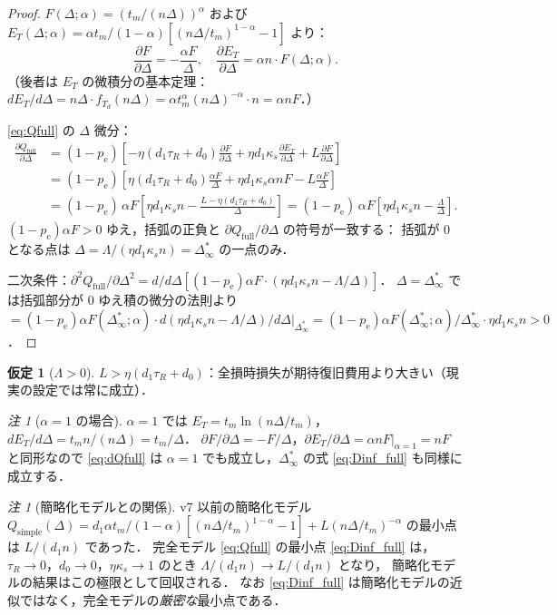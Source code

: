 \documentclass[12pt,a4paper]{article}
\theoremstyle{plain}
\theoremstyle{definition}
\newtheorem{assumption}[theorem]{仮定}
\theoremstyle{remark}
\newtheorem{remark}[theorem]{注}
\newcommand{\pe}{p_{\mathrm{e}}}
\newcommand{\Qf}{Q_{\mathrm{full}}}
\newcommand{\Dinf}{\Delta^{*}_{\infty}}
\begin{document}
\begin{proof}
$F(\Delta;\alpha)=(t_m/(n\Delta))^\alpha$ および $E_T(\Delta;\alpha)=\alpha t_m/(1-\alpha)[(n\Delta/t_m)^{1-\alpha}-1]$ より：
\[
\frac{\partial F}{\partial\Delta}=-\frac{\alpha F}{\Delta},\quad
\frac{\partial E_T}{\partial\Delta}=\alpha n\cdot F(\Delta;\alpha).
\]
（後者は $E_T$ の微積分の基本定理：$dE_T/d\Delta=n\Delta\cdot f_{T_d}(n\Delta)=\alpha t_m^\alpha(n\Delta)^{-\alpha}\cdot n=\alpha nF$．）

\eqref{eq:Qfull} の $\Delta$ 微分：
\begin{align*}
\frac{\partial\Qf}{\partial\Delta}
&=(1-\pe)\left[-\eta(d_1\tau_R+d_0)\frac{\partial F}{\partial\Delta}
+\eta d_1\kappa_s\frac{\partial E_T}{\partial\Delta}+L\frac{\partial F}{\partial\Delta}\right]\\
&=(1-\pe)\left[\eta(d_1\tau_R+d_0)\frac{\alpha F}{\Delta}
+\eta d_1\kappa_s\alpha n F-L\frac{\alpha F}{\Delta}\right]\\
&=(1-\pe)\,\alpha F\left[\eta d_1\kappa_s n-\frac{L-\eta(d_1\tau_R+d_0)}{\Delta}\right]
=(1-\pe)\,\alpha F\left[\eta d_1\kappa_s n-\frac{\Lambda}{\Delta}\right].
\end{align*}
$(1-\pe)\alpha F>0$ ゆえ，括弧の正負と $\partial\Qf/\partial\Delta$ の符号が一致する：
括弧が 0 となる点は $\Delta=\Lambda/(\eta d_1\kappa_s n)=\Dinf$ の一点のみ．

二次条件：$\partial^2\Qf/\partial\Delta^2=d/d\Delta[(1-\pe)\alpha F\cdot(\eta d_1\kappa_s n-\Lambda/\Delta)]$．
$\Delta=\Dinf$ では括弧部分が 0 ゆえ積の微分の法則より
$=(1-\pe)\alpha F(\Dinf;\alpha)\cdot d(\eta d_1\kappa_s n-\Lambda/\Delta)/d\Delta|_{\Dinf}
=(1-\pe)\alpha F(\Dinf;\alpha)/\Dinf\cdot\eta d_1\kappa_s n>0$．
\end{proof}

\begin{assumption}[$\Lambda>0$]\label{ass:Lambda}
$L>\eta(d_1\tau_R+d_0)$：全損時損失が期待復旧費用より大きい（現実の設定では常に成立）．
\end{assumption}

\begin{remark}[$\alpha=1$ の場合]\label{rem:alpha1}
$\alpha=1$ では $E_T=t_m\ln(n\Delta/t_m)$，$dE_T/d\Delta=t_m n/(n\Delta)=t_m/\Delta$．
$\partial F/\partial\Delta=-F/\Delta$，$\partial E_T/\partial\Delta=\alpha nF|_{\alpha=1}=nF$ と同形なので
\eqref{eq:dQfull} は $\alpha=1$ でも成立し，$\Dinf$ の式 \eqref{eq:Dinf_full} も同様に成立する．
\end{remark}

\begin{remark}[簡略化モデルとの関係]
v7 以前の簡略化モデル $Q_{\mathrm{simple}}(\Delta)=d_1\alpha t_m/(1-\alpha)[(n\Delta/t_m)^{1-\alpha}-1]+L(n\Delta/t_m)^{-\alpha}$
の最小点は $L/(d_1 n)$ であった．
完全モデル \eqref{eq:Qfull} の最小点 \eqref{eq:Dinf_full} は，
$\tau_R\to0$，$d_0\to0$，$\eta\kappa_s\to1$ のとき $\Lambda/(d_1 n)\to L/(d_1 n)$ となり，
簡略化モデルの結果はこの極限として回収される．
なお \eqref{eq:Dinf_full} は簡略化モデルの近似ではなく，完全モデルの\emph{厳密な}最小点である．
\end{remark}
\end{document}
